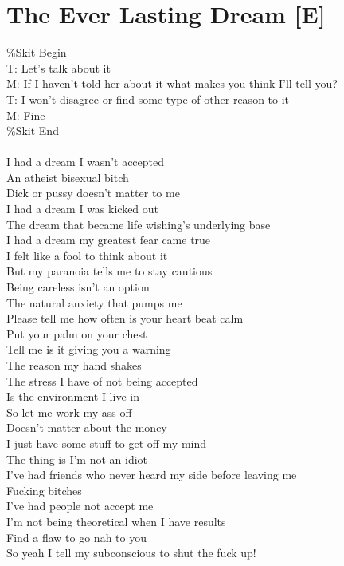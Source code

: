 \documentclass[12pt, b5paper, oneside]{book}
\begin{document}
\section{The Ever Lasting Dream [E]}
\%Skit Begin
\\T: Let's talk about it
\\M: If I haven't told her about it what makes you think I'll tell you?
\\T: I won't disagree or find some type of other reason to it
\\M: Fine
\\\%Skit End
%
\\\\I had a dream I wasn't accepted
\\An atheist bisexual bitch
\\Dick or pussy doesn't matter to me
\\I had a dream I was kicked out
\\The dream that became life wishing's underlying base
\\I had a dream my greatest fear came true
\\I felt like a fool to think about it
\\But my paranoia tells me to stay cautious
\\Being careless isn't an option
\\The natural anxiety that pumps me
\\Please tell me how often is your heart beat calm
\\Put your palm on your chest
\\Tell me is it giving you a warning
\\The reason my hand shakes
\\The stress I have of not being accepted
\\Is the environment I live in
\\So let me work my ass off
\\Doesn't matter about the money
\\I just have some stuff to get off my mind
%
\\The thing is I'm not an idiot
\\I've had friends who never heard my side before leaving me
\\Fucking bitches
\\I've had people not accept me
\\I'm not being theoretical when I have results
\\Find a flaw to go nah to you
\\So yeah I tell my subconscious to shut the fuck up!
\end{document}

